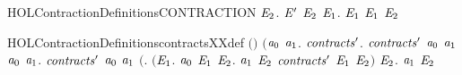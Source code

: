 \begin{SaveVerbatim}{HOLContractionDefinitionsCONTRACTION}
       \HOLSymConst{\HOLTokenForall{}}\ensuremath{\HOLBoundVar{E}\sb{\mathrm{2}}}. \ensuremath{\HOLBoundVar{E}\sp{\prime{}}} \HOLTokenTransBegin\HOLConst{\ensuremath{\tau}}\HOLTokenTransEnd \ensuremath{\HOLBoundVar{E}\sb{\mathrm{2}}} \HOLSymConst{\HOLTokenImp{}} \HOLSymConst{\HOLTokenExists{}}\ensuremath{\HOLBoundVar{E}\sb{\mathrm{1}}}.   \ensuremath{\HOLBoundVar{E}\sb{\mathrm{1}}} \HOLSymConst{\HOLTokenConj{}}  \ensuremath{\HOLBoundVar{E}\sb{\mathrm{1}}} \ensuremath{\HOLBoundVar{E}\sb{\mathrm{2}}}
\end{SaveVerbatim}
\newcommand{\HOLContractionDefinitionsCONTRACTION}{\UseVerbatim{HOLContractionDefinitionsCONTRACTION}}
\begin{SaveVerbatim}{HOLContractionDefinitionscontractsXXdef}
\HOLTokenTurnstile{} \ensuremath{(}\ensuremath{)} \HOLSymConst{\ensuremath{=}}
   \ensuremath{(}\HOLTokenLambda{}\ensuremath{\HOLBoundVar{a}\sb{\mathrm{0}}} \ensuremath{\HOLBoundVar{a}\sb{\mathrm{1}}}.
        \HOLSymConst{\HOLTokenExists{}}\ensuremath{\HOLBoundVar{contracts}\sp{\prime{}}}.
          \ensuremath{\HOLBoundVar{contracts}\sp{\prime{}}} \ensuremath{\HOLBoundVar{a}\sb{\mathrm{0}}} \ensuremath{\HOLBoundVar{a}\sb{\mathrm{1}}} \HOLSymConst{\HOLTokenConj{}}
          \HOLSymConst{\HOLTokenForall{}}\ensuremath{\HOLBoundVar{a}\sb{\mathrm{0}}} \ensuremath{\HOLBoundVar{a}\sb{\mathrm{1}}}.
            \ensuremath{\HOLBoundVar{contracts}\sp{\prime{}}} \ensuremath{\HOLBoundVar{a}\sb{\mathrm{0}}} \ensuremath{\HOLBoundVar{a}\sb{\mathrm{1}}} \HOLSymConst{\HOLTokenImp{}}
            \ensuremath{(}\HOLSymConst{\HOLTokenForall{}}. \ensuremath{(}\HOLSymConst{\HOLTokenForall{}}\ensuremath{\HOLBoundVar{E}\sb{\mathrm{1}}}.
                    \ensuremath{\HOLBoundVar{a}\sb{\mathrm{0}}} \HOLTokenTransBegin{} \HOLTokenTransEnd \ensuremath{\HOLBoundVar{E}\sb{\mathrm{1}}} \HOLSymConst{\HOLTokenImp{}}
                    \HOLSymConst{\HOLTokenExists{}}\ensuremath{\HOLBoundVar{E}\sb{\mathrm{2}}}. \ensuremath{\HOLBoundVar{a}\sb{\mathrm{1}}} \HOLTokenTransBegin{} \HOLTokenTransEnd \ensuremath{\HOLBoundVar{E}\sb{\mathrm{2}}} \HOLSymConst{\HOLTokenConj{}} \ensuremath{\HOLBoundVar{contracts}\sp{\prime{}}} \ensuremath{\HOLBoundVar{E}\sb{\mathrm{1}}} \ensuremath{\HOLBoundVar{E}\sb{\mathrm{2}}}\ensuremath{)} \HOLSymConst{\HOLTokenConj{}}
                 \HOLSymConst{\HOLTokenForall{}}\ensuremath{\HOLBoundVar{E}\sb{\mathrm{2}}}.
                   \ensuremath{\HOLBoundVar{a}\sb{\mathrm{1}}} \HOLTokenTransBegin{} \HOLTokenTransEnd \ensuremath{\HOLBoundVar{E}\sb{\mathrm{2}}} \HOLSymConst{\HOLTokenImp{}}

\end{SaveVerbatim}
